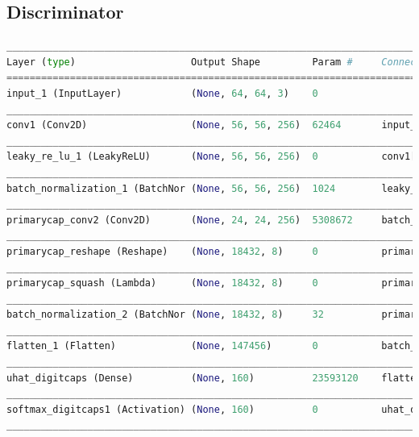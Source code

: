 \subsection{Discriminator} %
\label{sub:discriminator}
\begin{lstlisting}[basicstyle=\scriptsize,language=Python]
____________________________________________________________________________________________
Layer (type)                    Output Shape         Param #     Connected to               
============================================================================================
input_1 (InputLayer)            (None, 64, 64, 3)    0                                      
____________________________________________________________________________________________
conv1 (Conv2D)                  (None, 56, 56, 256)  62464       input_1[0][0]              
____________________________________________________________________________________________
leaky_re_lu_1 (LeakyReLU)       (None, 56, 56, 256)  0           conv1[0][0]                
____________________________________________________________________________________________
batch_normalization_1 (BatchNor (None, 56, 56, 256)  1024        leaky_re_lu_1[0][0]        
____________________________________________________________________________________________
primarycap_conv2 (Conv2D)       (None, 24, 24, 256)  5308672     batch_normalization_1[0][0]
____________________________________________________________________________________________
primarycap_reshape (Reshape)    (None, 18432, 8)     0           primarycap_conv2[0][0]     
____________________________________________________________________________________________
primarycap_squash (Lambda)      (None, 18432, 8)     0           primarycap_reshape[0][0]   
____________________________________________________________________________________________
batch_normalization_2 (BatchNor (None, 18432, 8)     32          primarycap_squash[0][0]    
____________________________________________________________________________________________
flatten_1 (Flatten)             (None, 147456)       0           batch_normalization_2[0][0]
____________________________________________________________________________________________
uhat_digitcaps (Dense)          (None, 160)          23593120    flatten_1[0][0]            
____________________________________________________________________________________________
softmax_digitcaps1 (Activation) (None, 160)          0           uhat_digitcaps[0][0]       
____________________________________________________________________________________________

\end{lstlisting}
